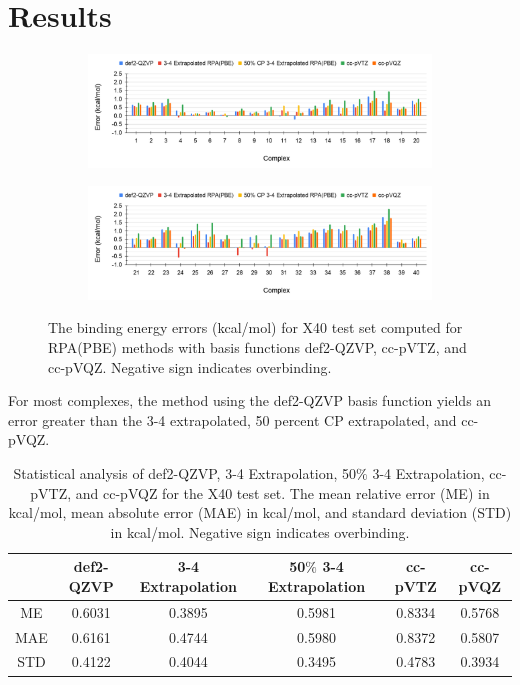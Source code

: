 \documentclass[11pt]{article}
\begin{document}
\section{Results}

\begin{figure}[H]
  \centering
  \begin{subfigure}{\textwidth}
    \center
    \includegraphics[scale=0.35]{def2-QZVP_1.png}
    \label{fig:def2-QZVP_1}
  \end{subfigure}
  \begin{subfigure}{\textwidth}
    \center
    \includegraphics[scale=0.35]{def2-QZVP_2.png}
    \label{fig:def2-QZVP_2}
  \end{subfigure}
  \caption{The binding energy errors (kcal/mol) for X40 test set computed
    for RPA(PBE) methods with basis functions def2-QZVP, cc-pVTZ, and
    cc-pVQZ. Negative sign indicates overbinding.}
  \label{fig:def2-QZVP Error}
\end{figure}

For most complexes, the method using the def2-QZVP basis function yields
an error greater than the 3-4 extrapolated, 50 percent CP
extrapolated, and cc-pVQZ. 

\begin{table}[hbpt]
  \caption{Statistical analysis of def2-QZVP, 3-4 Extrapolation, 50$\%$ 3-4
    Extrapolation, cc-pVTZ, and cc-pVQZ for the X40 test set. The mean
    relative error (ME) in kcal/mol, mean absolute error (MAE) in kcal/mol,
    and standard deviation (STD) in kcal/mol. Negative sign indicates overbinding.}
  \centering
  \begin{tabular}{c|c|c|c|c|c}
    & def2-QZVP & 3-4 Extrapolation & 50$\%$ 3-4 Extrapolation & cc-pVTZ  &
    cc-pVQZ \\
    \hline\hline
    ME & 0.6031 & 0.3895 & 0.5981 & 0.8334 & 0.5768 \\
    MAE & 0.6161 & 0.4744 & 0.5980 & 0.8372 & 0.5807 \\
    STD & 0.4122 & 0.4044 & 0.3495 & 0.4783 & 0.3934 \\
  \end{tabular}
  \label{tab:table_1}
\end{table}
\end{document}
